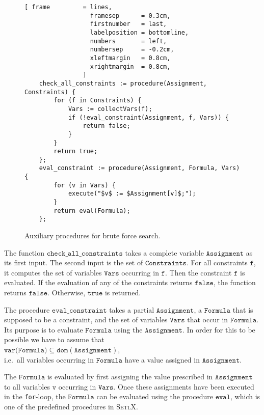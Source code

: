 \begin{figure}[!ht]
\centering
\begin{Verbatim}[ frame         = lines, 
                  framesep      = 0.3cm, 
                  firstnumber   = last,
                  labelposition = bottomline,
                  numbers       = left,
                  numbersep     = -0.2cm,
                  xleftmargin   = 0.8cm,
                  xrightmargin  = 0.8cm,
                ]
    check_all_constraints := procedure(Assignment, Constraints) {
        for (f in Constraints) {
            Vars := collectVars(f);
            if (!eval_constraint(Assignment, f, Vars)) {
                return false;
            }
        }
        return true;
    };       
    eval_constraint := procedure(Assignment, Formula, Vars) {
        for (v in Vars) {
            execute("$v$ := $Assignment[v]$;");
        }
        return eval(Formula);
    };
\end{Verbatim}
\vspace*{-0.3cm}
\caption{Auxiliary procedures for brute force search.}
\label{fig:csp-brute-force.stlx-2}
\end{figure}

The function $\mathtt{check\_all\_constraints}$ takes a complete variable $\mathtt{Assignment}$ as
its first input.  The second input is the set of $\mathtt{Constraints}$.  For all constraints
$\mathtt{f}$, it computes the set of variables $\mathtt{Vars}$ occurring in $\mathtt{f}$.  Then the
constraint $\mathtt{f}$ is evaluated.  If the evaluation of any of the constraints returns
$\mathtt{false}$, the function returns $\mathtt{false}$.  Otherwise, $\mathtt{true}$ is returned.

The procedure $\mathtt{eval\_constraint}$ takes a partial $\mathtt{Assignment}$, a $\mathtt{Formula}$
that is supposed to be a constraint, and the set of variables $\mathtt{Vars}$ that occur in
$\mathtt{Formula}$.  Its purpose is to evaluate $\mathtt{Formula}$ using the $\mathtt{Assignment}$.  In
order for this to be possible we have to assume that
\\[0.2cm]
\hspace*{1.3cm}
$\mathtt{var}(\mathtt{Formula)} \subseteq \mathtt{dom}(\mathtt{Assignment})$,
\\[0.2cm]
i.e.~all variables occurring in $\mathtt{Formula}$ have a value assigned in $\mathtt{Assignment}$.

The $\mathtt{Formula}$ is evaluated by first assigning the value prescribed in $\mathtt{Assignment}$ to
all variables $\mathtt{v}$ occurring in $\mathtt{Vars}$.  Once these assignments have been executed in
the \texttt{for}-loop, the $\mathtt{Formula}$ can be evaluated using the procedure $\mathtt{eval}$, which
is one of the predefined procedures in \textsc{SetlX}.

